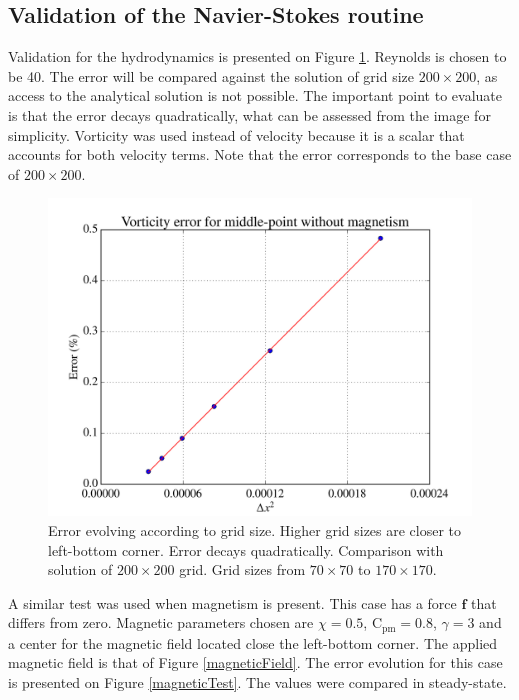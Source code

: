 \documentclass[journal]{IEEEtran}
\begin{document}
\subsection{Validation of the Navier-Stokes routine}

Validation for the hydrodynamics is presented on Figure \ref{hydrodynamicsTest}. Reynolds is chosen to be 40. The error will be compared against the solution of grid size $200\times 200$, as access to the analytical solution is not possible. The important point to evaluate is that the error decays quadratically, what can be assessed from the image for simplicity. Vorticity was used instead of velocity because it is a scalar that accounts for both velocity terms. Note that the error corresponds to the base case of $200\times 200$.

\begin{figure}[!t]
\centering
\includegraphics[width=\linewidth]{figures/validateHydrodynamicsRe40}
\caption{Error evolving according to grid size. Higher grid sizes are closer to left-bottom corner. Error decays quadratically. Comparison with solution of $200\times 200$ grid. Grid sizes from $70\times 70$ to $170\times 170$. \label{hydrodynamicsTest}}
\end{figure}

A similar test was used when magnetism is present. This case has a force $\mathbf{f}$ that differs from zero. Magnetic parameters chosen are $\chi=0.5$, $\mathrm{C}_\mathrm{pm}=0.8$, $\gamma=3$ and a center for the magnetic field located close the left-bottom corner. The applied magnetic field is that of Figure \ref{magneticField}. The error evolution for this case is presented on Figure \ref{magneticTest}. The values were compared in steady-state.
\end{document}
